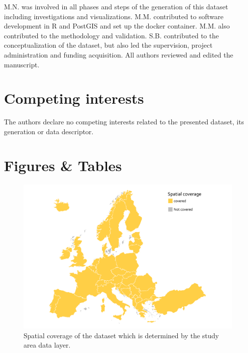 \documentclass[fleqn,10pt]{wlscirep}
\begin{document}
M.N. was involved in all phases and steps of the generation of this dataset including investigations and visualizations. M.M. contributed to software development in R and PostGIS and set up the docker container. M.M. also contributed to the methodology and validation. S.B. contributed to the conceptualization of the dataset, but also led the supervision, project administration and funding acquisition. All authors reviewed and edited the manuscript.

\hypertarget{competing-interests}{%
\section*{Competing interests}\label{competing-interests}}

The authors declare no competing interests related to the presented dataset, its generation or data descriptor.

\FloatBarrier

\hypertarget{figures-tables}{%
\section*{Figures \& Tables}\label{figures-tables}}

\FloatBarrier

\small

\begin{figure}[H]

{\centering \includegraphics[width=1\linewidth]{data_descriptor/tex/figure-studyareafigure-1} 

}

\caption{Spatial coverage of the dataset which is determined by the study area data layer.}\label{fig:studyareafigure}
\end{figure}
\end{document}
